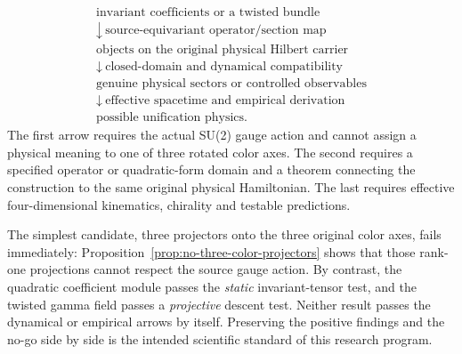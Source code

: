 \begin{equation}\label{eq:unification-promotion-chain}
 \begin{gathered}
 \text{invariant coefficients or a twisted bundle}\\
 \downarrow\ \text{source-equivariant operator/section map}\\
 \text{objects on the original physical Hilbert carrier}\\
 \downarrow\ \text{closed-domain and dynamical compatibility}\\
 \text{genuine physical sectors or controlled observables}\\
 \downarrow\ \text{effective spacetime and empirical derivation}\\
 \text{possible unification physics}.
 \end{gathered}
\end{equation}
The first arrow requires the actual SU(2)
gauge action and cannot assign a physical meaning
to one of three rotated color axes. The second
requires a specified operator or quadratic-form
domain and a theorem connecting the construction
to the same original physical Hamiltonian.
The last requires effective four-dimensional
kinematics, chirality and testable predictions.

The simplest candidate, three projectors onto
the three original color axes, fails immediately:
Proposition~\ref{prop:no-three-color-projectors}
shows that those rank-one projections cannot
respect the source gauge action. By contrast,
the quadratic coefficient module passes the
\emph{static} invariant-tensor test, and the
twisted gamma field passes a \emph{projective}
descent test. Neither result passes the
dynamical or empirical arrows by itself.
Preserving the positive findings and the
no-go side by side is the intended scientific
standard of this research program.

